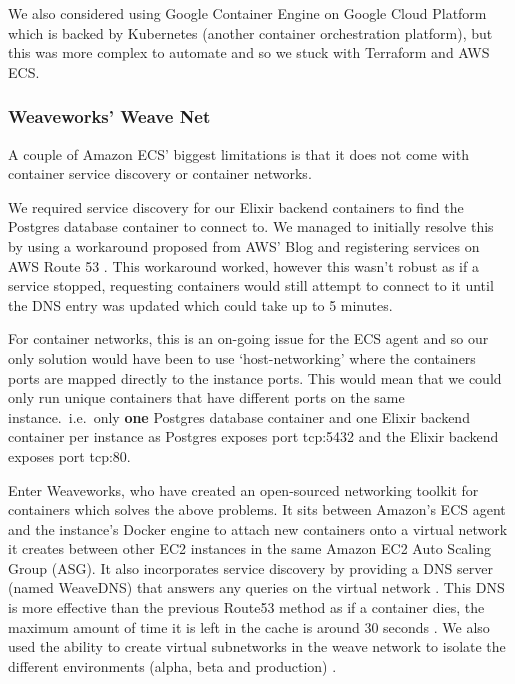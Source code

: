 \documentclass[11pt,a4paper]{report}
\begin{document}
We also considered using Google Container Engine on Google Cloud Platform which is backed by Kubernetes (another container orchestration platform), but this was more complex to automate and so we stuck with Terraform and AWS ECS.

\subsubsection{Weaveworks' Weave Net}

A couple of Amazon ECS' biggest limitations is that it does not come with container service discovery or container networks.

We required service discovery for our Elixir backend containers to find the Postgres database container to connect to. We managed to initially resolve this by using a workaround proposed from AWS' Blog and registering services on AWS Route 53 \cite{website:aws_ecs_dns}. This workaround worked, however this wasn't robust as if a service stopped, requesting containers would still attempt to connect to it until the DNS entry was updated which could take up to 5 minutes.

For container networks, this is an on-going issue for the ECS agent \cite{website:github_user_network_issue} and so our only solution would have been to use `host-networking' where the containers ports are mapped directly to the instance ports. This would mean that we could only run unique containers that have different ports on the same instance.\ i.e.\ only \textbf{one} Postgres database container and one Elixir backend container per instance as Postgres exposes port tcp:5432 and the Elixir backend exposes port tcp:80.

Enter Weaveworks, who have created an open-sourced networking toolkit for containers which solves the above problems. It sits between Amazon's ECS agent and the instance's Docker engine to attach new containers onto a virtual network it creates between other EC2 instances in the same Amazon EC2 Auto Scaling Group (ASG). It also incorporates service discovery by providing a DNS server (named WeaveDNS) that answers any queries on the virtual network \cite{website:weave_dns}. This DNS is more effective than the previous Route53 method as if a container dies, the maximum amount of time it is left in the cache is around 30 seconds \cite{website:weave_dns_fault_tolerance}. We also used the ability to create virtual subnetworks in the weave network to isolate the different environments (alpha, beta and production) \cite{website:weave_subnet_allocation}.
\end{document}
